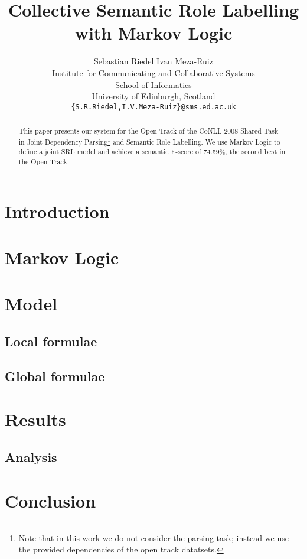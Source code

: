 \documentclass[11pt]{article}
\title{Collective Semantic Role Labelling with Markov Logic}
\author{Sebastian Riedel \qquad Ivan Meza-Ruiz\\
  Institute for Communicating and Collaborative Systems\\
  School of Informatics\\
  University of Edinburgh, Scotland\\
  {\tt\{S.R.Riedel,I.V.Meza-Ruiz\}@sms.ed.ac.uk} }
\date{}
\begin{document}
 


\maketitle
\begin{abstract}
This paper presents our system for the Open Track of the CoNLL 2008 Shared Task~\citep{surdeanu08conll} in Joint Dependency Parsing\footnote{Note that in this work we do not consider the parsing task; instead we use the provided dependencies of the open track datatsets.} and Semantic Role Labelling. We use Markov Logic to define a joint SRL model and achieve a semantic F-score of 74.59\%, the second best in the Open Track.
\end{abstract}

\section{Introduction}



\section{Markov Logic} \label{sec:markovlogic}



\section{Model} \label{sec:model} 


\subsection{Local formulae}



\subsection{Global formulae}



\section{Results}\label{sec:results}


\subsection{Analysis}


\section{Conclusion} \label{sec:conclusion}




\end{document}
